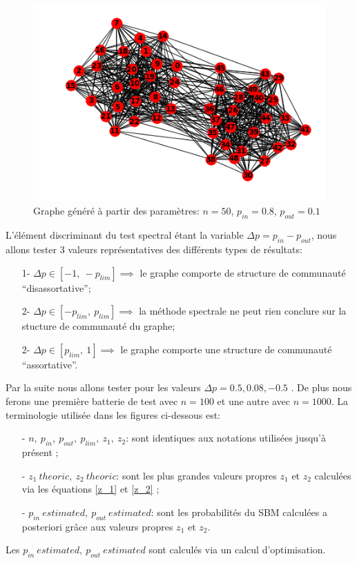 \begin{figure}[H]
\centering
\includegraphics[scale=0.6]{static/graph_n50_pin08_pout01.png}
\caption{Graphe généré à partir des paramètres: $n=50$, $p_{in}=0.8$, $p_{out}=0.1$}
\end{figure}

L'élément discriminant du test spectral étant la variable $ \Delta p= p_{in} - p_{out}$, nous allons tester 3 valeurs représentatives des différents types de résultats:
\begin{itemize}
	\item[1-] $\Delta p \in [-1,\: -p_{lim}] \implies$ le graphe comporte de structure de communauté ``disassortative'';
	\item[2-] $\Delta p \in [-p_{lim},\: p_{lim}] \implies$ la méthode spectrale ne peut rien conclure sur la stucture de communauté du graphe;
	\item[2-] $\Delta p \in [p_{lim},\: 1] \implies$ le graphe comporte une structure de communauté ``assortative''.\\
\end{itemize}

Par la suite nous allons tester pour les valeurs $\Delta p= 0.5, 0.08, -0.5$ .
De plus nous ferons une première batterie de test avec $n=100$ et une autre avec $n=1000$.
La terminologie utilisée dans les figures ci-dessous est:
\begin{itemize}
	\item[- \underline{$n,\: p_{in},\: p_{out},\: p_{lim},\: z_1,\: z_2$}:] sont identiques aux notations utilisées jusqu'à présent ;
	\item[- \underline{$z_1\: theoric, \:z_2\: theoric$}:] sont les plus grandes valeurs propres $z_1$ et $z_2$ calculées via les équations \eqref{z_1} et \eqref{z_2} ;    
	\item[- \underline{$p_{in}\: estimated, \:p_{out}\: estimated$}:] sont les probabilités du SBM calculées a posteriori grâce aux valeurs propres $z_1$ et $z_2$.\\
\end{itemize}
Les $p_{in}\: estimated, \:p_{out}\: estimated$ sont calculés via un calcul d'optimisation.\\


